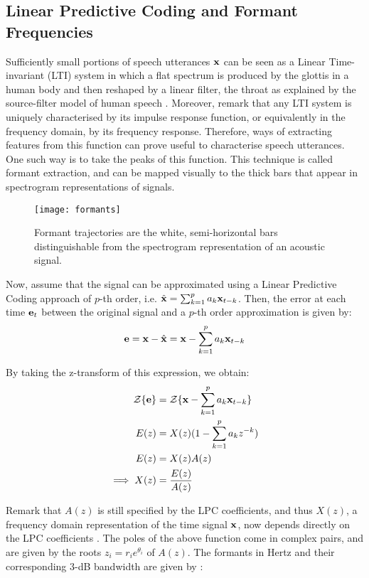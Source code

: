 \documentclass[../main.tex]{subfiles}
\begin{document}
\subsection{Linear Predictive Coding and Formant Frequencies} \label{subsection_formants}
Sufficiently small portions of speech utterances $\mathbf{x}$ can be seen as a Linear Time-invariant (LTI) system in which a flat spectrum is produced by the glottis in a human body and then reshaped by a linear filter, the throat as explained by the source-filter model of human speech \cite{Bello}. Moreover, remark that any LTI system is uniquely characterised by its impulse response function, or equivalently in the frequency domain, by its frequency response\cite{markel1976}. Therefore, ways of extracting features from this function can prove useful to characterise speech utterances. One such way is to take the peaks of this function. This technique is called formant extraction, and can be mapped visually to the thick bars that appear in spectrogram representations of signals.
\begin{figure}[t]
\centering
\texttt{[image: formants]}
\caption{Formant trajectories are the white, semi-horizontal bars distinguishable from the spectrogram representation of an acoustic signal.}
\label{fig_formants}
\end{figure}
\par Now, assume that the signal can be approximated using a Linear Predictive Coding approach of $p$-th order, i.e. $\hat{\mathbf{x}} = \sum_{k=1}^pa_k\mathbf{x}_{t-k}$. Then, the error at each time $\mathbf{e}_t$ between the original signal and a $p$-th order approximation is given by: 
\begin{align*}
\mathbf{e} = \mathbf{x} - \hat{\mathbf{x}} = \mathbf{x} - \sum_{k=1}^p{a_k \mathbf{x}_{t-k}}
\end{align*} 
\par By taking the z-transform of this expression, we obtain:
\begin{align*}
\mathcal{Z}\{\mathbf{e}\} &= \mathcal{Z}\{\mathbf{x} - \sum_{k=1}^p{a_k \mathbf{x}_{t-k}}\}\\
E(z) &= X(z)(1-\sum_{k=1}^p{a_k z^{-k}})\\
E(z) &= X(z)A(z)\\
\implies X(z) &= \frac{E(z)}{A(z)}
\end{align*}
\par Remark that $A(z)$ is still specified by the LPC coefficients, and thus $X(z)$, a frequency domain representation of the time signal $\mathbf{x}$, now depends directly on the LPC coefficients \cite{Hosom2006}. The poles of the above function come in complex pairs, and are given by the roots $z_i = r_ie^{\theta_i}$ of $A(z)$. The formants in Hertz and their corresponding 3-dB bandwidth are given by \cite{Snell1993,Mathworks2015}:
\end{document}
